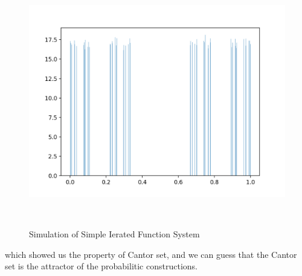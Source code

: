 \documentclass[12pt]{article}
\theoremstyle{plain}
\begin{document}
\begin{figure}[H]
\begin{minipage}[c][0.33\width]{
   0.33\textwidth}
   \includegraphics[width=.9\textwidth]{figure/section4/simple-stats-7.png}
\end{minipage}
\\[3ex]\caption{Simulation of Simple Ierated Function System}\label{Simple-iter-system}
\end{figure}
which showed us the property of Cantor set, and we can guess that the Cantor set is the attractor of the probabilitic constructions.
\end{document}

